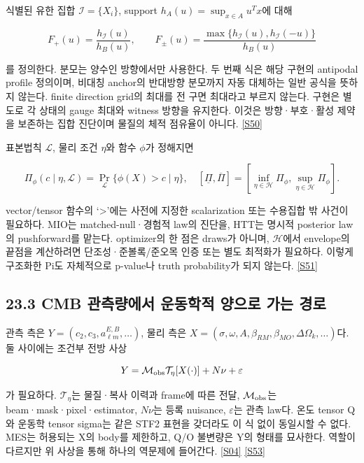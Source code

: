 \documentclass[11pt,a4paper]{article}
\begin{document}
식별된 유한 집합 \(\mathcal I=\{X_i\}\), support \(h_A(u)=\sup_{x\in A}u^Tx\)에 대해


\[
F_+(u)=\frac{h_{\mathcal I}(u)}{h_B(u)},\qquad
F_{\pm}(u)=\frac{\max\{h_{\mathcal I}(u),h_{\mathcal I}(-u)\}}{h_B(u)}
\]

를 정의한다. 분모는 양수인 방향에서만 사용한다. 두 번째 식은 해당 구현의 antipodal profile 정의이며, 비대칭 anchor의 반대방향 분모까지 자동 대체하는 일반 공식을 뜻하지 않는다. finite direction grid의 최대를 전 구면 최대라고 부르지 않는다. 구현은 별도로 각 상태의 gauge 최대와 witness 방향을 유지한다. 이것은 방향·부호·활성 제약을 보존하는 집합 진단이며 물질의 체적 점유율이 아니다. \hyperlink{src:S50}{[S50]}


표본법칙 \(\mathcal L\), 물리 조건 \(\eta\)와 함수 \(\phi\)가 정해지면


\[
\Pi_\phi(c\mid\eta,\mathcal L)
=\Pr_{\mathcal L}\{\phi(X)>c\mid\eta\},
\quad
[\underline\Pi,\overline\Pi]
=\left[\inf_{\eta\in\mathcal H}\Pi_\phi,
\sup_{\eta\in\mathcal H}\Pi_\phi\right].
\]

vector/tensor 함수의 ‘>’에는 사전에 지정한 scalarization 또는 수용집합 밖 사건이 필요하다. MIO는 matched-null·경험적 law의 진단을, HTT는 명시적 posterior law의 pushforward를 맡는다. optimizer의 한 점은 draws가 아니며, \(\mathcal H\)에서 envelope의 끝점을 계산하려면 단조성·준볼록/준오목 인증 또는 별도 최적화가 필요하다. 이렇게 구조화한 Pi도 자체적으로 p-value나 truth probability가 되지 않는다. \hyperlink{src:S51}{[S51]}


\subsection*{23.3 CMB 관측량에서 운동학적 양으로 가는 경로}

관측 측은 \(Y=(c_2,c_3,a^{E,B}_{\ell m},\ldots)\), 물리 측은 \(X=(\sigma,\omega,A,\beta_{RM},\beta_{MO},\Delta\Omega_k,\ldots)\)다. 둘 사이에는 조건부 전방 사상


\[
Y=\mathcal M_{\rm obs}\mathcal T_\eta[X(\cdot)]
+N\nu+\varepsilon
\]

가 필요하다. \(\mathcal T_\eta\)는 물질·복사 이력과 frame에 따른 전달, \(\mathcal M_{\rm obs}\)는 beam·mask·pixel·estimator, \(N\nu\)는 등록 nuisance, \(\varepsilon\)는 관측 law다. 온도 tensor Q와 운동학 tensor sigma는 같은 STF2 표현을 갖더라도 이 식 없이 동일시할 수 없다. MES는 허용되는 X의 body를 제한하고, Q/O 불변량은 Y의 형태를 묘사한다. 역할이 다르지만 위 사상을 통해 하나의 역문제에 들어간다. \hyperlink{src:S04}{[S04]} \hyperlink{src:S53}{[S53]}
\end{document}
